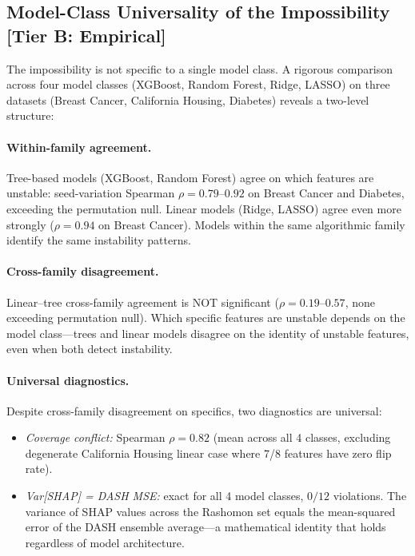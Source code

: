 \documentclass[11pt,a4paper]{article}
\begin{document}
\subsection{Model-Class Universality of the Impossibility\,\textnormal{\normalsize[Tier B: Empirical]}}
\label{sec:model-class}

The impossibility is not specific to a single model class.  A rigorous comparison across four model classes (XGBoost, Random Forest, Ridge, LASSO) on three datasets (Breast Cancer, California Housing, Diabetes) reveals a two-level structure:

\paragraph{Within-family agreement.}
Tree-based models (XGBoost, Random Forest) agree on which features are unstable: seed-variation Spearman $\rho = 0.79$--$0.92$ on Breast Cancer and Diabetes, exceeding the permutation null.  Linear models (Ridge, LASSO) agree even more strongly ($\rho = 0.94$ on Breast Cancer).  Models within the same algorithmic family identify the same instability patterns.

\paragraph{Cross-family disagreement.}
Linear--tree cross-family agreement is NOT significant ($\rho = 0.19$--$0.57$, none exceeding permutation null).  Which specific features are unstable depends on the model class---trees and linear models disagree on the identity of unstable features, even when both detect instability.

\paragraph{Universal diagnostics.}
Despite cross-family disagreement on specifics, two diagnostics are universal:
\begin{itemize}
  \item \emph{Coverage conflict:} Spearman $\rho = 0.82$ (mean across all 4 classes, excluding degenerate California Housing linear case where 7/8 features have zero flip rate).
  \item \emph{Var[SHAP] = DASH MSE:} exact for all 4 model classes, $0/12$ violations.  The variance of SHAP values across the Rashomon set equals the mean-squared error of the DASH ensemble average---a mathematical identity that holds regardless of model architecture.
\end{itemize}
\end{document}
